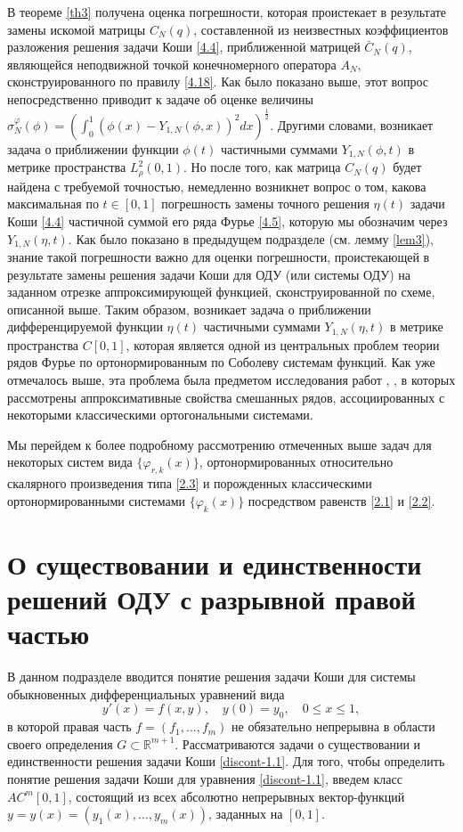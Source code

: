 В теореме \ref{th3} получена оценка  погрешности, которая проистекает в результате замены искомой матрицы $C_N(q)$, составленной из неизвестных коэффициентов  разложения решения задачи Коши \eqref{4.4}, приближенной матрицей $\bar C_N(q)$, являющейся неподвижной точкой конечномерного оператора $A_N$, сконструированного по правилу \eqref{4.18}.
Как было показано выше, этот вопрос непосредственно приводит к задаче об оценке величины  $\sigma_N^\varphi(\phi)=(\int_{0}^1(\phi(x)- Y_{1,N}(\phi,x))^2 dx)^\frac12$. Другими словами, возникает задача о приближении функции $\phi(t)$ частичными суммами $Y_{1,N}(\phi,t)$  в метрике пространства $L^2_\rho(0,1)$.
Но после того, как  матрица $C_N(q)$ будет найдена с требуемой точностью, немедленно возникнет вопрос о том, какова максимальная по $t\in[0,1]$ погрешность замены точного решения $\eta(t)$ задачи Коши \eqref{4.4} частичной суммой его ряда Фурье \eqref{4.5}, которую мы обозначим через  $Y_{1,N}(\eta,t)$. Как было показано в предыдущем подразделе (см. лемму \ref{lem3}), знание такой погрешности важно для оценки погрешности, проистекающей в результате замены решения задачи Коши для ОДУ (или системы ОДУ) на заданном отрезке  аппроксимирующей функцией, сконструированной по схеме, описанной выше.  Таким образом, возникает задача о приближении  дифференцируемой функции $\eta(t)$ частичными суммами $Y_{1,N}(\eta,t)$ в метрике пространства $C[0,1]$, которая является одной из центральных проблем теории рядов Фурье по ортонормированным по Соболеву системам функций. Как уже отмечалось выше, эта проблема  была предметом исследования  работ  \cite{Shar11, Shar2003, Shar2006, Shar2008, Shar19, Shar18, sharap3, Shar_Dag_Elec, SHII, Shar2017, SharSMJ2017}, \cite{SharIzv2018},  в которых  рассмотрены аппроксимативные свойства смешанных рядов, ассоциированных с некоторыми классическими ортогональными системами.

Мы перейдем к более подробному рассмотрению отмеченных выше задач для некоторых  систем вида $\{\varphi_{r,k}(x)\}$, ортонормированных относительно скалярного произведения типа \eqref{2.3} и порожденных классическими ортонормированными системами $\{\varphi_k(x)\}$ посредством равенств  \eqref{2.1} и \eqref{2.2}.



\section{О существовании и единственности решений ОДУ с разрывной правой частью}

В данном подразделе вводится понятие решения задачи Коши для системы обыкновенных дифференциальных уравнений вида
\begin{equation}\label{discont-1.1}
y'(x)=f(x,y),\quad y(0)=y_0, \quad 0\le x\le 1,
\end{equation}
в которой правая часть  $f=(f_1,\ldots,f_m)$ не обязательно непрерывна в области своего определения $G\subset\mathbb{R}^{m+1}$. Рассматриваются задачи о существовании и единственности решения задачи Коши \eqref{discont-1.1}. Для того, чтобы определить понятие  решения задачи Коши для уравнения \eqref{discont-1.1}, введем класс  $AC^m[0,1]$, состоящий из всех абсолютно непрерывных вектор-функций $y=y(x)=(y_1(x),\ldots,y_m(x))$, заданных на $[0,1]$.

